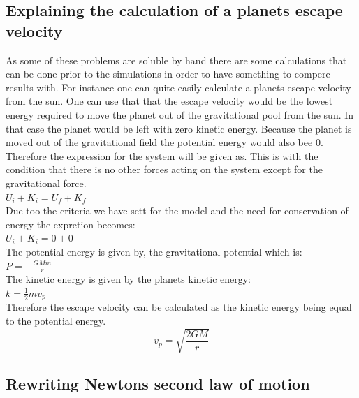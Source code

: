 \documentclass{article}
\begin{document}
\subsection{Explaining the calculation of a planets escape velocity} \label{sec:escapevelocity}

    As some of these problems are soluble by hand there are some calculations that can be done prior to the simulations in order to have something to compere results with. For instance one can quite easily calculate a planets escape velocity from the sun. One can use that that the escape velocity would be the lowest energy required to move the planet out of the gravitational pool from the sun. In that case the planet would be left with zero kinetic energy. Because the planet is moved out of the gravitational field the potential energy would also bee 0. Therefore the expression for the system will be given as. This is with the condition that there is no other forces acting on the system except for the gravitational force.   \\

    $U_i + K_i = U_f + K_f$ \\

    Due too the criteria we have sett for the model and the need for conservation of energy the expretion becomes: \\

    $U_i + K_i = 0 + 0$ \\

    The potential energy is given by, the gravitational potential which is:\\

    $P = - \frac{GMm}{r}$ \\

    The kinetic energy is given by the planets kinetic energy: \\

    $k = \frac{1}{2} mv_p$ \\

    Therefore the escape velocity can be calculated as the kinetic energy being equal to the potential energy. \\

    \begin{equation} \label{eq:escapevelocity}
        v_p =  \sqrt{\frac{2GM}{r}}
    \end{equation}


\subsection{Rewriting Newtons second law of motion} \label{sec:n2l}
\end{document}
